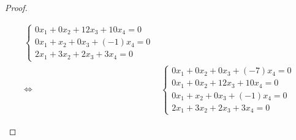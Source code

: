 \begin{proof}
\begin{enumerate}[label = (\alph*)]
\begin{align*}
\begin{cases}
                      0x_{1} + 0x_{2} + 12x_{3} + 10x_{4} = 0 \\
                      0x_{1} + x_{2} + 0x_{3} + (-1)x_{4} = 0 \\
                      2x_{1} + 3x_{2} + 2x_{3} + 3x_{4} = 0
                  \end{cases}                            \\
                  \Longleftrightarrow\quad &
                  \begin{cases}
                      0x_{1} + 0x_{2} + 0x_{3} + (-7)x_{4} = 0 \\
                      0x_{1} + 0x_{2} + 12x_{3} + 10x_{4} = 0  \\
                      0x_{1} + x_{2} + 0x_{3} + (-1)x_{4} = 0  \\
                      2x_{1} + 3x_{2} + 2x_{3} + 3x_{4} = 0
                  \end{cases}
              \end{align*}
              \endgroup
              

\end{enumerate}
\end{proof}
